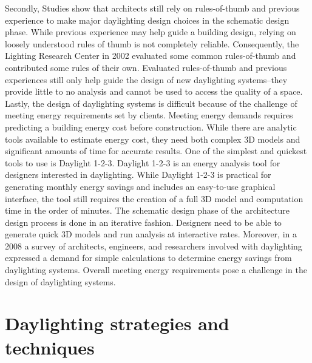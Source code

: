 		Secondly, Studies show that architects still rely on rules-of-thumb and previous experience to make major daylighting design choices in the schematic design phase\cite{Galasiu}.
		While previous experience may help guide a building design, relying on loosely understood rules of thumb is not completely reliable.
		Consequently, the Lighting Research Center in 2002 evaluated some common rules-of-thumb and contributed some rules of their own\cite{Leslie}.
		Evaluated rules-of-thumb and previous experiences still only help guide the design of new daylighting systems--they provide little to no analysis and cannot be used to access the quality of a space.\\

		Lastly, the design of daylighting systems is difficult because of the challenge of meeting energy requirements set by clients.
		Meeting energy demands requires predicting a building energy cost before construction.
		While there are analytic tools available to estimate energy cost, they need both complex 3D models and significant amounts of time for accurate results.
		One of the simplest and quickest tools to use is Daylight 1-2-3.
		Daylight 1-2-3 is an energy analysis tool for designers interested in daylighting.
		While Daylight 1-2-3 is practical for generating monthly energy savings and includes an easy-to-use graphical interface, the tool still requires the creation of a full 3D model and computation time in the order of minutes. \cite{Reinhart}
		The schematic design phase of the architecture design process is done in an iterative fashion.
		Designers need to be able to generate quick 3D models and run analysis at interactive rates.
		Moreover, in a 2008 a survey of architects, engineers, and researchers involved with daylighting expressed a demand for simple calculations to determine energy savings from daylighting systems.\cite{Galasiu} 
		Overall meeting energy requirements pose a challenge in the design of daylighting systems. \\

\section{Daylighting strategies and techniques}

